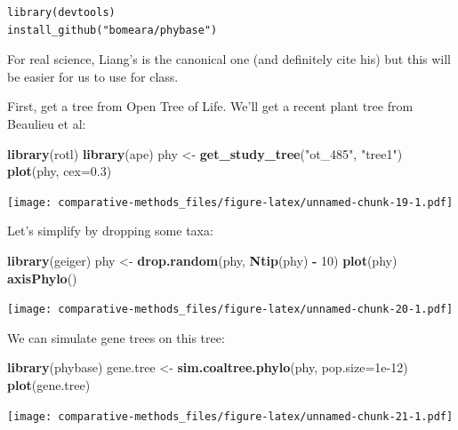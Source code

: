 \documentclass[
]{article}
\newenvironment{Shaded}{\begin{snugshade}}{\end{snugshade}}
\newcommand{\DataTypeTok}[1]{\textcolor[rgb]{0.13,0.29,0.53}{#1}}
\newcommand{\DecValTok}[1]{\textcolor[rgb]{0.00,0.00,0.81}{#1}}
\newcommand{\FloatTok}[1]{\textcolor[rgb]{0.00,0.00,0.81}{#1}}
\newcommand{\KeywordTok}[1]{\textcolor[rgb]{0.13,0.29,0.53}{\textbf{#1}}}
\newcommand{\NormalTok}[1]{#1}
\newcommand{\OperatorTok}[1]{\textcolor[rgb]{0.81,0.36,0.00}{\textbf{#1}}}
\newcommand{\StringTok}[1]{\textcolor[rgb]{0.31,0.60,0.02}{#1}}
\begin{document}
\begin{verbatim}
library(devtools)
install_github("bomeara/phybase")
\end{verbatim}

For real science, Liang's is the canonical one (and definitely cite his) but this will be easier for us to use for class.

First, get a tree from Open Tree of Life. We'll get a recent plant tree from Beaulieu et al:

\begin{Shaded}
\begin{Highlighting}[]
\KeywordTok{library}\NormalTok{(rotl)}
\KeywordTok{library}\NormalTok{(ape)}
\NormalTok{phy <{-}}\StringTok{ }\KeywordTok{get\_study\_tree}\NormalTok{(}\StringTok{"ot\_485"}\NormalTok{, }\StringTok{"tree1"}\NormalTok{)}
\KeywordTok{plot}\NormalTok{(phy, }\DataTypeTok{cex=}\FloatTok{0.3}\NormalTok{)}
\end{Highlighting}
\end{Shaded}

\texttt{[image: comparative-methods\_files/figure-latex/unnamed-chunk-19-1.pdf]}

Let's simplify by dropping some taxa:

\begin{Shaded}
\begin{Highlighting}[]
\KeywordTok{library}\NormalTok{(geiger)}
\NormalTok{phy <{-}}\StringTok{ }\KeywordTok{drop.random}\NormalTok{(phy, }\KeywordTok{Ntip}\NormalTok{(phy) }\OperatorTok{{-}}\StringTok{ }\DecValTok{10}\NormalTok{)}
\KeywordTok{plot}\NormalTok{(phy)}
\KeywordTok{axisPhylo}\NormalTok{()}
\end{Highlighting}
\end{Shaded}

\texttt{[image: comparative-methods\_files/figure-latex/unnamed-chunk-20-1.pdf]}

We can simulate gene trees on this tree:

\begin{Shaded}
\begin{Highlighting}[]
\KeywordTok{library}\NormalTok{(phybase)}
\NormalTok{gene.tree <{-}}\StringTok{ }\KeywordTok{sim.coaltree.phylo}\NormalTok{(phy, }\DataTypeTok{pop.size=}\FloatTok{1e{-}12}\NormalTok{)}
\KeywordTok{plot}\NormalTok{(gene.tree)}
\end{Highlighting}
\end{Shaded}

\texttt{[image: comparative-methods\_files/figure-latex/unnamed-chunk-21-1.pdf]}
\end{document}
